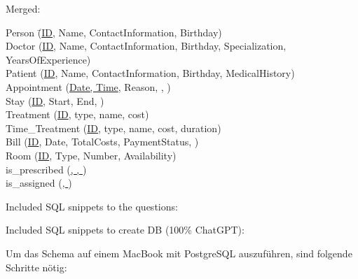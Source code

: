 \documentclass{article}
\begin{document}
Merged:
\begin{center}
\begin{tabbing}
    Person \qquad\qquad\qquad\= (\uline{ID}, Name, ContactInformation, Birthday)\\
    Doctor \> (\uline{ID}, Name, ContactInformation, Birthday, Specialization, YearsOfExperience)\\
    Patient \> (\uline{ID}, Name, ContactInformation, Birthday, MedicalHistory)\\
    Appointment \> (\uline{Date, Time}, Reason, , )\\
    Stay \> (\uline{ID}, Start, End, )\\
    Treatment \> (\uline{ID}, type, name, cost)\\
    Time\_Treatment \> (\uline{ID}, type, name, cost, duration)\\
    Bill \> (\uline{ID}, Date, TotalCosts, PaymentStatus, )\\
    Room \> (\uline{ID}, Type, Number, Availability)\\[1em]
    is\_prescribed \> (\uline{, , })\\
    is\_assigned \> (\uline{, })
\end{tabbing}
\end{center}


\task{}
Included SQL snippets to the questions:





\newpage
\task{}
Included SQL snippets to create DB (100\% ChatGPT):



\newpage
\task{}
Um das Schema auf einem MacBook mit PostgreSQL auszuführen, sind folgende Schritte nötig:
\end{document}
